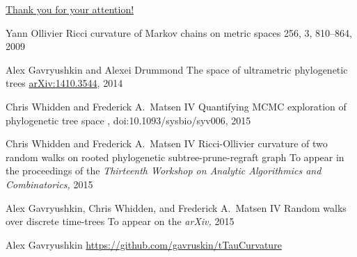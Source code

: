 \documentclass{beamer}
\theoremstyle{example}
\begin{document}
\begin{frame}{\href{http://alex.gavruskin.com/pictures/}{\Large{Thank
you for your attention!}}}


\scriptsize

Yann Ollivier
\newblock Ricci curvature of Markov chains on metric spaces
 256, 3, 810--864, 2009

Alex Gavryushkin and Alexei Drummond
\newblock The space of ultrametric phylogenetic trees
 \href{http://arxiv.org/abs/1410.3544}{arXiv:1410.3544}, 2014

Chris Whidden and Frederick A.\ Matsen IV
\newblock Quantifying MCMC exploration of phylogenetic tree space
, doi:10.1093/sysbio/syv006, 2015

Chris Whidden and Frederick A.\ Matsen IV
\newblock Ricci-Ollivier curvature of two random walks on rooted phylogenetic subtree-prune-regraft graph
\newblock To appear in the proceedings of the {\em Thirteenth Workshop on Analytic Algorithmics and Combinatorics,} 2015

Alex Gavryushkin, Chris Whidden, and Frederick A.\ Matsen IV
\newblock Random walks over discrete time-trees
\newblock To appear on the {\em arXiv,} 2015

Alex Gavryushkin
\newblock \url{https://github.com/gavruskin/tTauCurvature}

\end{frame}
\end{document}
